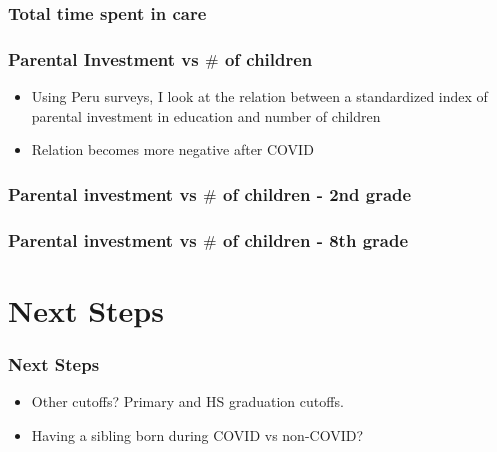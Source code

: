 \documentclass{beamer}
\begin{document}
\begin{frame}
    \label{update_scott}
    \frametitle{Total time spent in care}
        {
    }
\end{frame}

\begin{frame}
    \frametitle{Parental Investment vs $\#$ of children}
    \begin{itemize}
        \item Using Peru surveys, I look at the relation between a standardized index of parental investment in education and number of children
        \item Relation becomes more negative after COVID
    \end{itemize}
\end{frame}

\begin{frame}
    \frametitle{Parental investment vs $\#$ of children - 2nd grade}
    
\end{frame}

\begin{frame}
    \frametitle{Parental investment vs $\#$  of children - 8th grade}
    
\end{frame}



\section{Next Steps}

\begin{frame}
    \label{update_scott}
    \frametitle{Next Steps}
    \begin{itemize}
        \item Other cutoffs? Primary and HS graduation cutoffs.
        \item Having a sibling born during COVID vs non-COVID?
    \end{itemize}
\end{frame}
\end{document}
